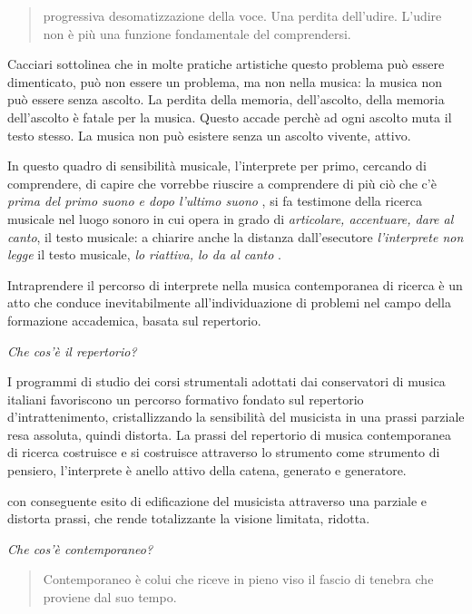 \documentclass{gs-adonis}
\begin{document}
\begin{quote}
progressiva desomatizzazione della voce. Una perdita dell'udire. L'udire
non è più una funzione fondamentale del comprendersi. \cite{Cacciari1995}
\end{quote}

Cacciari sottolinea che in molte pratiche artistiche questo problema può essere
dimenticato, può non essere un problema, ma non nella musica: la musica non può
essere senza ascolto. La perdita della memoria, dell'ascolto, della memoria
dell'ascolto è fatale per la musica. Questo accade perchè ad ogni ascolto muta
il testo stesso. La musica non può esistere senza un ascolto vivente, attivo.

In questo quadro di sensibilità musicale, l'interprete per primo, cercando di
comprendere, di capire che vorrebbe riuscire a comprendere di più ciò che c'è
\emph{prima del primo suono e dopo l'ultimo suono} \cite{Cacciari1995}, si fa
testimone della ricerca musicale nel luogo sonoro in cui opera in grado di
\emph{articolare, accentuare, dare al canto}, il testo musicale: a chiarire
anche la distanza dall'esecutore \emph{l'interprete non legge} il testo
musicale, \emph{lo riattiva, lo da al canto} \cite{Cacciari1995}.

Intraprendere il percorso di interprete nella musica contemporanea di ricerca è
un atto che conduce inevitabilmente all'individuazione di problemi nel campo
della formazione accademica, basata sul repertorio.

\emph{Che cos'è il repertorio?}

I programmi di studio dei corsi strumentali adottati dai conservatori di musica
italiani favoriscono un percorso formativo fondato sul repertorio d'intrattenimento, cristallizzando la sensibilità del musicista in una prassi
parziale resa assoluta, quindi distorta. La prassi del repertorio di musica
contemporanea di ricerca costruisce e si costruisce attraverso lo strumento
come strumento di pensiero, l'interprete è anello attivo della catena, generato
e generatore.

con conseguente esito di edificazione del musicista attraverso una parziale e distorta prassi, che rende totalizzante la visione limitata, ridotta.

\emph{Che cos'è contemporaneo?}

\begin{quote}
  Contemporaneo è colui che riceve in pieno viso il fascio di tenebra che proviene dal suo tempo. \cite{agamben2008che}
\end{quote}
\end{document}
